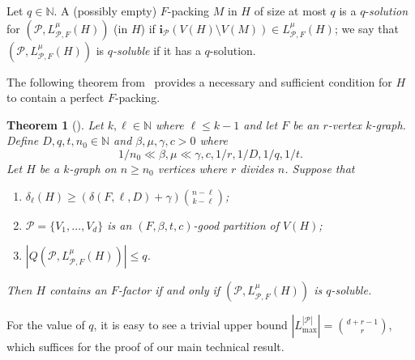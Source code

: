 \documentclass[11pt, letterpaper]{amsart}
\theoremstyle{plain}
\numberwithin{equation}{section}
\newtheorem{theorem}[thm]{Theorem}
\theoremstyle{definition}
\newcommand\card[1]{\left| #1 \right|}
\begin{document}
     Let \(q \in \mathbb{N}\). A (possibly empty) \(F\)-packing \(M\) in \(H\) of size at most \(q\) is a \(q\)-\emph{solution} for \((\mathcal{P}, L^{\mu}_{\mathcal{P}, F}(H))\) (in \(H\)) if \(\mathbf{i}_{\mathcal{P}}(V(H) \setminus V(M)) \in L^{\mu}_{\mathcal{P}, F}(H)\); we say that \((\mathcal{P}, L^{\mu}_{\mathcal{P}, F}(H))\) is \emph{\(q\)-soluble} if it has a \(q\)-solution. 
     
     The following theorem from~\cite{han2020complexity} provides a necessary and sufficient condition for \(H\) to contain a perfect \(F\)-packing.

     \begin{theorem}[\cite{han2020complexity}]\label{structural theorem}
         Let $k,\ell\in \mathbb{N}$ where $\ell\le k-1$ and let $F$ be an $r$-vertex $k$-graph. 
         Define $D,q,t,n_0\in\mathbb{N}$ and $\beta,\mu,\gamma,c>0$ where
         \[
         1/n_0\ll\beta,\mu\ll\gamma,c,1/r,1/D,1/q,1/t.
         \]
         Let $H$ be a $k$-graph on $n\ge n_0$ vertices where $r$ divides $n$. 
         Suppose that 
         \begin{enumerate}[label=(\roman*)]
             \item $\delta_{\ell}(H)\ge (\delta(F,\ell,D)+ \gamma)\binom{n-\ell}{k-\ell}$;\label{item:\romannumeral1}
             \item $\mathcal{P}=\{V_1, \dots, V_d\}$ is an $(F,\beta,t,c)$-good partition of $V(H)$;\label{item:\romannumeral2}
             \item $|Q(\mathcal{P},L_{\mathcal{P},F}^{\mu}(H))|\le q$.\label{item:\romannumeral3}
         \end{enumerate}
         Then $H$ contains an $F$-factor if and only if $(\mathcal{P},L^{\mu}_{\mathcal{P},F}(H))$ is $q$-soluble.
     \end{theorem}

    For the value of $q$, it is easy to see a trivial upper bound \(|L_{\max}^{\card{\mathcal{P}}}|=\binom{d+r-1}{r}\), which suffices for the proof of our main technical result. 
\end{document}
